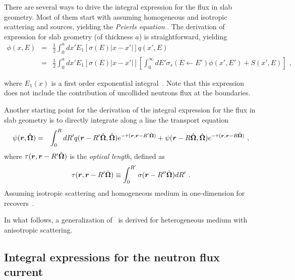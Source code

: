 There are several ways to drive the integral expression for the flux in slab geometry. Most of them start with assuming homogeneous and isotropic scattering and sources, yielding the \emph{Peierls equation} \cite{Davison-1957,Case-1967,Bell-1970,Pomraning-1973,Duderstadt-1979,Lewis-1984}. The derivation of expression for slab geometry (of thickness $a$) is straightforward, yielding
\begin{eqnarray}\label{eq:flux-slab-l-0-no-bndry-terms}
\phi(x,E)&=&\frac{1}{2}\int_0^a { dx'
	E_1\left[\sigma(E)\lvert x-x'\rvert\right] q(x',E) 
}\nonumber \\
&=& \frac{1}{2}\int_0^a { \!\!\! dx'
	E_1\left[\sigma(E)\lvert x-x'\rvert\right]
	\left[
	\int_0^\infty { \!\!\! dE'
		\sigma_s(E\leftarrow E')\phi(x',E') 
	} + S(x',E)
	\right] 
} \,\, ,
\end{eqnarray}

where $E_1(x)$ is a first order exponential integral~\cite{Abramowitz-1964}. Note that this expression does not include the contribution of uncollided neutrons  flux at the boundaries.

Another starting point for the derivation of the integral expression for the flux in slab geometry is to directly integrate along a line the transport equation~\cite{Davison-1957,Pomraning-1973,Duderstadt-1979,Lewis-1984}
\begin{eqnarray}\label{eq:full-ITE-w-bndry-terms}
\psi(\bm{r},\hat{\bm{\Omega}}) &=& \int_0^R { dR'
	q(\bm{r}-R'\hat{\bm{\Omega}},\hat{\bm{\Omega}}) e^{-\tau(\bm{r},\bm{r}-R'\hat{\bm{\Omega}})}
} 
+\psi(\bm{r}-R\hat{\bm{\Omega}},\hat{\bm{\Omega}}) e^{-\tau(\bm{r},\bm{r}-R\hat{\bm{\Omega}})}
\,\, ,
\end{eqnarray}
where $\tau(\bm{r},\bm{r}-R'\hat{\bm{\Omega}})$ is the \emph{optical length}, defined as
\begin{equation}\label{eq:opl}
\tau(\bm{r},\bm{r}-R'\hat{\bm{\Omega}}) \equiv 
\int_0^{R'} {\sigma(\bm{r}-R''\hat{\bm{\Omega}})dR'} \,\, .
\end{equation}
Assuming isotropic scattering and homogeneous medium in one-dimension for~ recovers~. 

In what follows, a generalization of~ is derived for heterogeneous medium with anisotropic scattering.  
%
\subsection{Integral expressions for the neutron flux  current}
\label{sec:int-flux-J}


